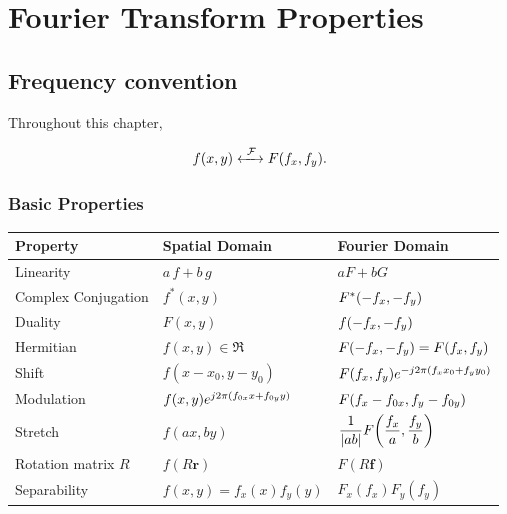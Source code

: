 %
%

\chapter{Fourier Transform Properties}
\section{Frequency convention}
Throughout this chapter,

\[
f(x,y)\xleftrightarrow{\ \FT\ }F(\fx,\fy).
\]

\subsection{Basic Properties}

\begin{center}
\begin{tabular}{lll}
\toprule
Property & Spatial Domain & Fourier Domain\\
\midrule

Linearity &
$a\,f+b\,g$
&
$aF+bG$

\\[0.4cm]

Complex Conjugation &
$f^*(x,y)$
&
$F^*(-f_x,-f_y)$

\\[0.4cm]

Duality &
$F(x,y)$
&
$f(-f_x,-f_y)$
\\[0.4cm]

Hermitian &
$f(x,y) \in \Re$
&
$F(-f_x,-f_y) = F(f_x,f_y)$

\\[0.4cm]


Shift &
$f(x-x_0,y-y_0)$
&
$F(f_x,f_y)
e^{-j2\pi(f_x x_0+f_y y_0)}$

\\[0.4cm]

Modulation &
$f(x,y)
e^{j2\pi(f_{0x}x+f_{0y}y)}$
&
$F(f_x-f_{0x},f_y-f_{0y})$

\\[0.4cm]

Stretch &
$f(ax,by)$
&
$\displaystyle
\frac{1}{|ab|}
F\!\left(\frac{f_x}{a},
\frac{f_y}{b}\right)$

\\[0.4cm]

Rotation matrix \(R\) &
$f(R\mathbf{r})$
&
$F(R\mathbf{f})$
\\[0.4cm]

Separability &
$f(x,y) = f_x(x)f_y(y)$ &
$F_x(f_x) F_y(f_y)$
\\

\bottomrule
\end{tabular}
\end{center}
